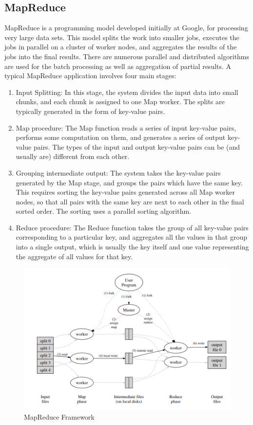 \documentclass{article}
\begin{document}
\subsection{MapReduce}
MapReduce is a programming model developed initially at Google, for processing very large data sets. This model splits the work into smaller jobs, executes the jobs in parallel on a cluster of worker nodes, and aggregates the results of the jobs into the final results. There are numerous parallel and distributed algorithms are used for the batch processing as well as aggregation of partial results. A typical MapReduce application involves four main stages:
 \begin{enumerate}
     \item Input Splitting: In this stage, the system divides the input data into small chunks, and each chunk is assigned to one Map worker. The splits are typically generated in the form of key-value pairs.
     \item Map procedure: The Map function reads a series of input key-value pairs, performs some computation on them, and generates a series of output key-value pairs. The types of the input and output key-value pairs can be (and usually are) different from each other.
     \item Grouping intermediate output: The system takes the key-value pairs generated by the Map stage, and groups the pairs which have the same key. This requires sorting the key-value pairs generated across all Map worker nodes, so that all pairs with the same key are next to each other in the final sorted order. The sorting uses a parallel sorting algorithm.
     \item Reduce procedure: The Reduce function takes the group of all key-value pairs corresponding to a particular key, and aggregates all the values in that group into a single output, which is usually the key itself and one value representing the aggregate of all values for that key.
 \end{enumerate}

\begin{figure}[ht]
    \centering
    \includegraphics[width=1\linewidth]{./images/mapreduce.png}
    \caption{MapReduce Framework \cite{mapreduce}}
    \label{fig:mapreduce}
\end{figure}
\end{document}
